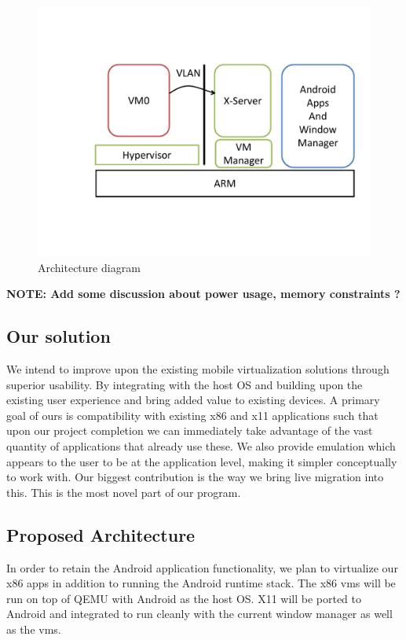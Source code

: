 \begin{figure}[tbh]
\centering
\includegraphics[width=1.0\columnwidth]{arch}
\caption{Architecture diagram}
\label{fig:arch}
\end{figure}

{\bf NOTE: Add some discussion about power usage, memory constraints ? \newline}
\subsection{Our solution}
\label{oursbetter}
We intend to improve upon the existing mobile virtualization solutions through superior usability.  By integrating with the host OS and building upon the existing user experience and bring added value to existing devices.
A primary goal of ours is compatibility with existing x86 and x11 applications such that upon our project completion we can immediately take advantage of the vast quantity of applications that already use these.
We also provide emulation which appears to the user to be at the application level, making it simpler conceptually to work with.
Our biggest contribution is the way we bring live migration into this.  This is the most novel part of our program.

\subsection{Proposed Architecture}
\label{proposedarch}
In order to retain the Android application functionality, we plan to virtualize our x86 apps in addition to running the Android runtime stack.  The x86 vms will be run on top of QEMU with Android as the host OS.  X11 will be ported to Android and integrated to run cleanly with the current window manager as well as the vms.  
